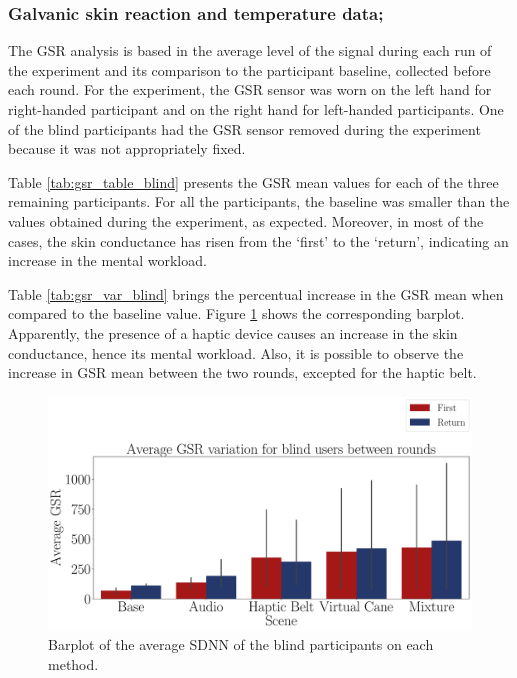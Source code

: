 \subsubsection{Galvanic skin reaction and temperature data;}
\label{subsubsec:results_gsr_temp_1}

The GSR analysis is based in the average level of the signal during each run of the experiment and its comparison to the participant baseline, collected before each round. For the experiment, the GSR sensor was worn on the left hand for right-handed participant and on the right hand for left-handed participants. One of the blind participants had the GSR sensor removed during the experiment because it was not appropriately fixed.

Table \ref{tab:gsr_table_blind} presents the GSR mean values for each of the three remaining participants. For all the participants, the baseline was smaller than the values obtained during the experiment, as expected. Moreover, in most of the cases, the skin conductance has risen from the ‘first’ to the ‘return’, indicating an increase in the mental workload.



Table \ref{tab:gsr_var_blind} brings the percentual increase in the GSR mean when compared to the baseline value. Figure \ref{fig:barplot_gsr_avg_5_scene_blind} shows the corresponding barplot. Apparently, the presence of a haptic device causes an increase in the skin conductance, hence its mental workload. Also, it is possible to observe the increase in GSR mean between the two rounds, excepted for the haptic belt.



\begin{figure}[!htb]
    \centering
    \includegraphics[width = \textwidth]{Resultados/GSR/Figuras/pdf/barplot_gsr_avg_5_scene_blind.pdf}
    \caption{Barplot of the average SDNN of the blind participants on each method.}
    \label{fig:barplot_gsr_avg_5_scene_blind}
\end{figure}

